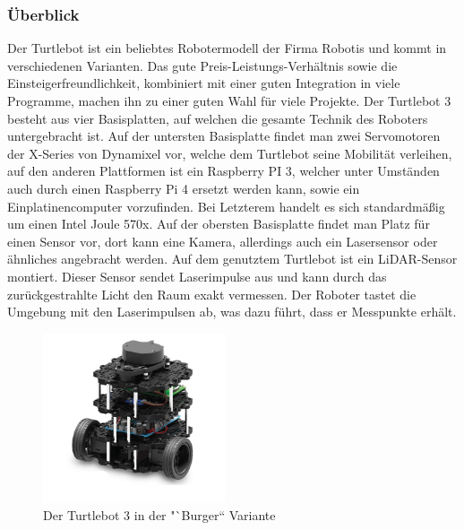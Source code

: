 {{		\subsubsection{Überblick}
		{
			Der Turtlebot ist ein beliebtes Robotermodell der Firma Robotis und kommt in verschiedenen Varianten. Das gute Preis-Leistungs-Verhältnis sowie die Einsteigerfreundlichkeit, kombiniert mit einer guten Integration in viele Programme, machen ihn zu einer guten Wahl für viele Projekte.
			Der Turtlebot 3 besteht aus vier Basisplatten, auf welchen die gesamte Technik des Roboters untergebracht ist. Auf der untersten Basisplatte findet man zwei Servomotoren der X-Series von Dynamixel vor, welche dem Turtlebot seine Mobilität verleihen, auf den anderen Plattformen ist ein Raspberry PI 3, welcher unter Umständen auch durch einen Raspberry Pi 4 ersetzt werden kann, sowie ein Einplatinencomputer vorzufinden. Bei Letzterem handelt es sich standardmäßig um einen Intel Joule 570x. Auf der obersten Basisplatte findet man Platz für einen Sensor vor, dort kann eine Kamera, allerdings auch ein Lasersensor oder ähnliches angebracht werden. Auf dem genutztem Turtlebot ist ein LiDAR-Sensor montiert. Dieser Sensor sendet Laserimpulse aus und kann durch das zurückgestrahlte Licht den Raum exakt vermessen. Der Roboter tastet die Umgebung mit den Laserimpulsen ab, was dazu führt, dass er Messpunkte erhält. \parencite{turtlebotabout}
			
			\begin{figure}[H]
				\centering
				\includegraphics[height=5cm]{Bilder/turtlebot_3_burger.png}
				\caption{Der Turtlebot 3 in der "`Burger“ Variante} 
				\label{pic:turtle3burger}
			\end{figure}
			
		}
		
}}
